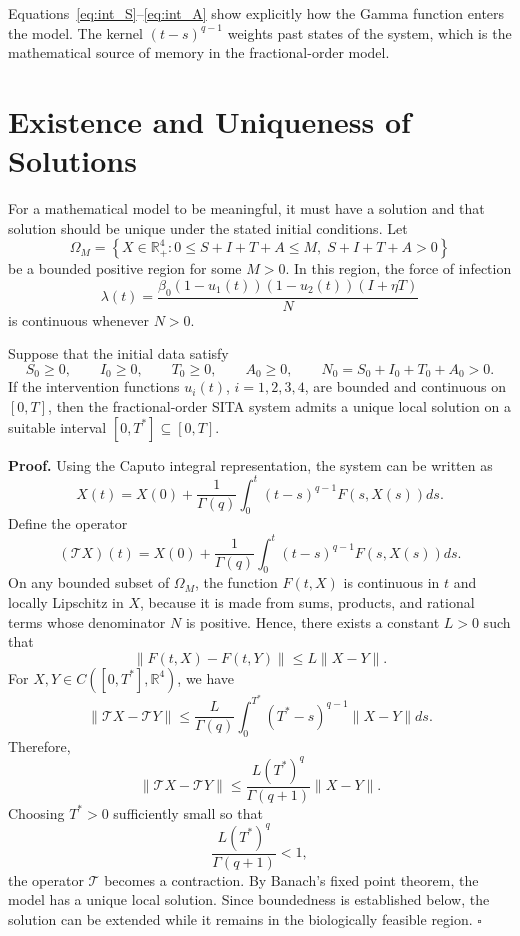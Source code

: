 \begin{remarkbox}[title={Interpretation}]
Equations~\eqref{eq:int_S}--\eqref{eq:int_A} show explicitly how the Gamma function enters the model. The kernel $(t-s)^{q-1}$ weights past states of the system, which is the mathematical source of memory in the fractional-order model.
\end{remarkbox}

\section{Existence and Uniqueness of Solutions}

For a mathematical model to be meaningful, it must have a solution and that solution should be unique under the stated initial conditions. Let
\[
\Omega_M=\left\{X\in\mathbb{R}_+^4: 0\leq S+I+T+A\leq M,\; S+I+T+A>0\right\}
\]
be a bounded positive region for some $M>0$. In this region, the force of infection
\[
\lambda(t)=\frac{\beta_0(1-u_1(t))(1-u_2(t))(I+\eta T)}{N}
\]
is continuous whenever $N>0$.

\begin{resultbox}[title={Theorem 4.1 --- Existence and Uniqueness}]
Suppose that the initial data satisfy
\[
S_0\geq0,\qquad I_0\geq0,\qquad T_0\geq0,\qquad A_0\geq0,
\qquad N_0=S_0+I_0+T_0+A_0>0.
\]
If the intervention functions $u_i(t)$, $i=1,2,3,4$, are bounded and continuous on $[0,T]$, then the fractional-order SITA system admits a unique local solution on a suitable interval $[0,T^*]\subseteq[0,T]$.
\end{resultbox}

\noindent\textbf{Proof.}
Using the Caputo integral representation, the system can be written as
\[
X(t)=X(0)+\frac{1}{\Gamma(q)}
\int_0^t(t-s)^{q-1}F(s,X(s))ds.
\]
Define the operator
\[
(\mathcal{T}X)(t)=X(0)+\frac{1}{\Gamma(q)}
\int_0^t(t-s)^{q-1}F(s,X(s))ds.
\]
On any bounded subset of $\Omega_M$, the function $F(t,X)$ is continuous in $t$ and locally Lipschitz in $X$, because it is made from sums, products, and rational terms whose denominator $N$ is positive. Hence, there exists a constant $L>0$ such that
\[
\|F(t,X)-F(t,Y)\|\leq L\|X-Y\|.
\]
For $X,Y\in C([0,T^*],\mathbb{R}^4)$, we have
\[
\|\mathcal{T}X-\mathcal{T}Y\|
\leq
\frac{L}{\Gamma(q)}
\int_0^{T^*}(T^*-s)^{q-1}\|X-Y\|ds.
\]
Therefore,
\[
\|\mathcal{T}X-\mathcal{T}Y\|
\leq
\frac{L(T^*)^q}{\Gamma(q+1)}\|X-Y\|.
\]
Choosing $T^*>0$ sufficiently small so that
\[
\frac{L(T^*)^q}{\Gamma(q+1)}<1,
\]
the operator $\mathcal{T}$ becomes a contraction. By Banach's fixed point theorem, the model has a unique local solution. Since boundedness is established below, the solution can be extended while it remains in the biologically feasible region. \hfill$\square$

